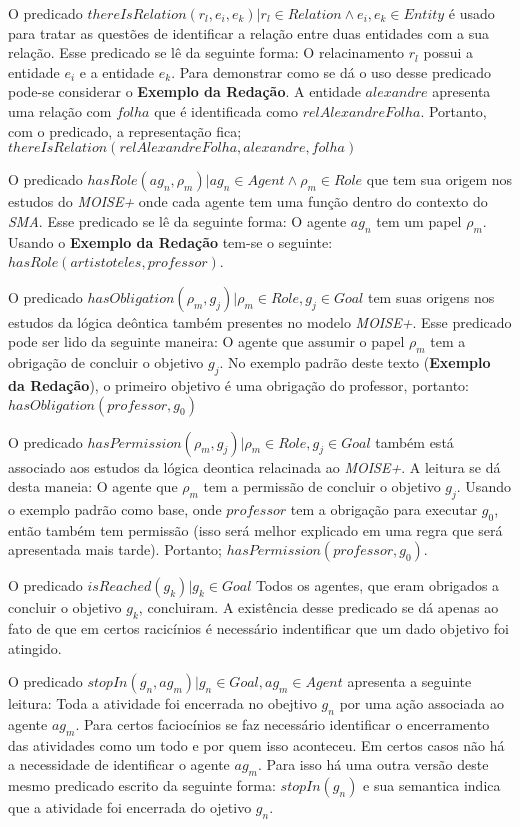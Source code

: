 O predicado $thereIsRelation(r_l,e_i,e_k) | r_l \in Relation \wedge  e_i, e_k \in Entity$ é usado para tratar as questões de identificar a relação entre 
duas entidades com a sua relação. Esse predicado se lê da seguinte forma: O relacinamento $r_l$ possui a entidade $e_i$ e a entidade
$e_k$. Para demonstrar como se dá o uso desse predicado pode-se considerar o \textbf{Exemplo da Redação}. A entidade $alexandre$ apresenta 
uma relação com $folha$ que é identificada como $relAlexandreFolha$. Portanto, com o predicado, a representação 
fica; $thereIsRelation(relAlexandreFolha,alexandre,folha)$

O predicado $hasRole(ag_n,\rho_m) | ag_n \in Agent \wedge \rho_m \in Role$ que tem sua origem nos estudos do \textit{MOISE+} onde 
cada agente tem uma função dentro do contexto do \textit{SMA}. Esse predicado se lê da seguinte forma: O agente $ag_n$ tem um
papel $\rho_m$. Usando o \textbf{Exemplo da Redação} tem-se o seguinte: $hasRole(artistoteles,professor)$. 

O predicado $hasObligation(\rho_m,g_j) | \rho_m \in Role, g_j \in Goal $ tem suas origens nos estudos da lógica deôntica também 
presentes no modelo \textit{MOISE+}. Esse predicado pode ser lido da seguinte maneira: O agente que assumir o papel $\rho_m$ tem a 
obrigação de concluir o objetivo $g_j$. No exemplo padrão deste texto (\textbf{Exemplo da Redação}), o primeiro objetivo é uma
obrigação do professor, portanto: $hasObligation(professor,g_0)$

O predicado $hasPermission(\rho_m, g_j) | \rho_m \in Role, g_j \in Goal $ também está associado aos estudos da lógica deontica
relacinada ao \textit{MOISE+}. A leitura se dá desta maneia: O agente que $\rho_m$ tem a permissão de concluir o objetivo $g_j$.
Usando o exemplo padrão como base, onde $professor$ tem a obrigação para executar $g_0$, então também tem permissão (isso
será melhor explicado em uma regra que será apresentada mais tarde). Portanto; $hasPermission(professor,g_0)$.  

O predicado $isReached(g_k) | g_k \in Goal $ Todos os agentes, que eram obrigados a concluir o objetivo $g_k$, concluiram. A 
existência desse predicado se dá apenas ao fato de que em certos racicínios é necessário indentificar que um dado objetivo 
foi atingido. 

O predicado $stopIn(g_n, ag_m) | g_n \in Goal, ag_m \in Agent$ apresenta a seguinte leitura: Toda a atividade foi encerrada no
obejtivo $g_n$ por uma ação associada ao agente $ag_m$. Para certos faciocínios se faz necessário identificar o encerramento
das atividades como um todo e por quem isso aconteceu. Em certos casos não há a necessidade de identificar o agente $ag_m$. Para
isso há uma outra versão deste mesmo predicado escrito da seguinte forma: $stopIn(g_n)$ e sua semantica indica que a atividade 
foi encerrada do ojetivo $g_n$.

